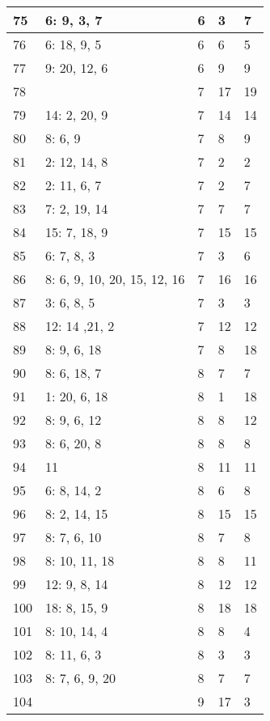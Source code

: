 \documentclass{article} %
\begin{document}
\begin{longtable}{| l | l | l | l | l |}
        75 & 6: 9, 3, 7 & 6 & 3 & 7 \\ \hline
        76 & 6: 18, 9, 5 & 6 & 6 & 5 \\ \hline
        77 & 9: 20, 12, 6 & 6 & 9 & 9 \\ \hline
        78 &  & 7 & 17 & 19 \\ \hline
        79 & 14: 2, 20, 9 & 7 & 14 & 14 \\ \hline
        80 & 8: 6, 9 & 7 & 8 & 9 \\ \hline
        81 & 2: 12, 14, 8 & 7 & 2 & 2 \\ \hline
        82 & 2: 11, 6, 7 & 7 & 2 & 7 \\ \hline
        83 & 7: 2, 19, 14 & 7 & 7 & 7 \\ \hline
        84 & 15: 7, 18, 9 & 7 & 15 & 15 \\ \hline
        85 & 6: 7, 8, 3 & 7 & 3 & 6 \\ \hline
        86 & 8: 6, 9, 10, 20, 15, 12, 16 & 7 & 16 & 16 \\ \hline
        87 & 3: 6, 8, 5 & 7 & 3 & 3 \\ \hline
        88 & 12: 14 ,21, 2 & 7 & 12 & 12 \\ \hline
        89 & 8: 9, 6, 18 & 7 & 8 & 18 \\ \hline
        90 & 8: 6, 18, 7 & 8 & 7 & 7 \\ \hline
        91 & 1: 20, 6, 18 & 8 & 1 & 18 \\ \hline
        92 & 8: 9, 6, 12 & 8 & 8 & 12 \\ \hline
        93 & 8: 6, 20, 8 & 8 & 8 & 8 \\ \hline
        94 & 11 & 8 & 11 & 11 \\ \hline
        95 & 6: 8, 14, 2 & 8 & 6 & 8 \\ \hline
        96 & 8: 2, 14, 15 & 8 & 15 & 15 \\ \hline
        97 & 8: 7, 6, 10 & 8 & 7 & 8 \\ \hline
        98 & 8: 10, 11, 18 & 8 & 8 & 11 \\ \hline
        99 & 12: 9, 8, 14 & 8 & 12 & 12 \\ \hline
        100 & 18: 8, 15, 9 & 8 & 18 & 18 \\ \hline
        101 & 8: 10, 14, 4 & 8 & 8 & 4 \\ \hline
        102 & 8: 11, 6, 3 & 8 & 3 & 3 \\ \hline
        103 & 8: 7, 6, 9, 20 & 8 & 7 & 7 \\ \hline
        104 &  & 9 & 17 & 3 \\ \hline

\end{longtable}
\end{document}

